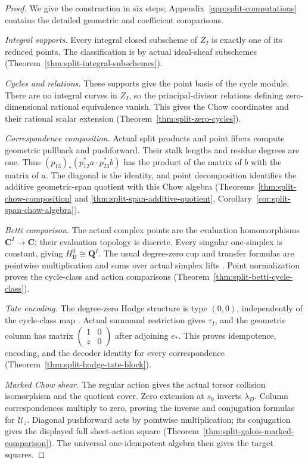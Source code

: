 \documentclass[11pt]{article}
\theoremstyle{definition}
\theoremstyle{remark}
\newcommand{\Q}{\mathbf Q}
\begin{document}
\begin{proof}
We give the construction in six steps; Appendix~\ref{app:split-computations} contains the detailed
geometric and coefficient comparisons.

\emph{Integral supports.}
Every integral closed subscheme of \(Z_I\) is exactly one of its reduced
points.  The classification is by actual ideal-sheaf subschemes
(Theorem~\ref{thm:split-integral-subschemes}).

\emph{Cycles and relations.}
These supports give the point basis of the cycle module.  There are no
integral curves in \(Z_I\), so the principal-divisor relations defining
zero-dimensional rational equivalence vanish.  This gives the Chow
coordinates and their rational scalar extension
(Theorem~\ref{thm:split-zero-cycles}).

\emph{Correspondence composition.}
Actual split products and point fibers compute geometric pullback and
pushforward.  Their stalk lengths and residue degrees are one.  Thus
\((p_{13})_*(p_{12}^*a\cdot p_{23}^*b)\) has the product of the matrix
of \(b\) with the matrix of \(a\).
The diagonal is the identity, and point decomposition identifies the
additive geometric-span quotient with this Chow algebra
(Theorems~\ref{thm:split-chow-composition} and
\ref{thm:split-span-additive-quotient},
Corollary~\ref{cor:split-span-chow-algebra}).

\emph{Betti comparison.}
The actual complex points are the evaluation homomorphisms
\(\mathbf C^I\to\mathbf C\); their evaluation topology is discrete.
Every singular one-simplex is constant, giving
\(H^0_{\mathrm B}\cong\Q^I\).  The usual degree-zero cup and transfer
formulas are pointwise multiplication and sums over actual simplex
lifts \cite[\S\S3.1, 3.2, 3.G]{HatcherAlgebraicTopology}.
Point normalization proves the cycle-class and action comparisons
(Theorem~\ref{thm:split-betti-cycle-class}).

\emph{Tate encoding.}
The degree-zero Hodge structure is type \((0,0)\), independently of the
cycle-class map \cite[\S1]{DeligneHodgeConjecture}.
Actual summand restriction gives \(\tau_I\), and the geometric column
has matrix \(\left(\begin{smallmatrix}1&0\\z&0\end{smallmatrix}\right)\)
after adjoining \(e_*\).  This proves idempotence, encoding, and the
decoder identity for every correspondence
(Theorem~\ref{thm:split-hodge-tate-block}).

\emph{Marked Chow shear.}
The regular action gives the actual torsor collision isomorphism and the
quotient cover.  Zero extension at \(s_0\) inverts \(\lambda_D\).
Column correspondences multiply to zero, proving the inverse and
conjugation formulas for \(\mathcal U_z\).  Diagonal pushforward acts by
pointwise multiplication; its conjugation gives the displayed full
sheet-action square (Theorem~\ref{thm:split-galois-marked-comparison}).
The universal one-idempotent algebra then gives the target squares.
\end{proof}
\end{document}
